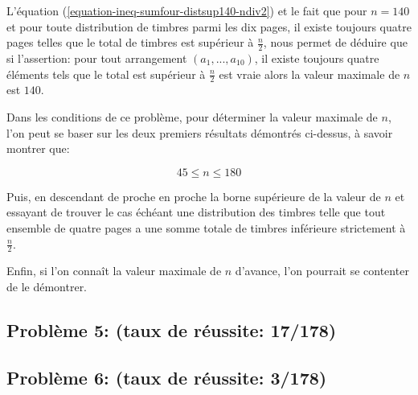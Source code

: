 \documentclass[12pt,a4paper,article]{memoir}
\begin{document}
L'équation (\ref{equation-ineq-sumfour-distsup140-ndiv2}) et le fait que pour $n=140$ et pour toute distribution de timbres parmi les dix pages, il existe toujours quatre pages telles que le total de timbres est supérieur à $\frac{n}{2}$, nous permet de déduire que si l'assertion: pour tout arrangement $(a_{1}, ..., a_{10})$, il existe toujours quatre éléments tels que le total est supérieur à $\frac{n}{2}$ est vraie alors la valeur maximale de $n$ est $140$.

\begin{myremark}[colback=red!5!white,colframe=blue!75!black,mytitle={Comment trouver la valeur maximale de $n$}, label=rmthr]
Dans les conditions de ce problème, pour déterminer la valeur maximale de $n$, l'on peut se baser sur les deux premiers résultats démontrés ci-dessus, à savoir montrer que:

\[45 \leq n \leq 180\]

Puis, en descendant de proche en proche la borne supérieure de la valeur de $n$ et essayant de trouver le cas échéant une distribution des timbres telle que tout ensemble de quatre pages a une somme totale de timbres inférieure strictement à $\frac{n}{2}$.

\bigskip

Enfin, si l'on connaît la valeur maximale de $n$ d'avance, l'on pourrait se contenter de le démontrer.
\end{myremark}

\subsection{Problème 5: (taux de réussite: 17/178)}
\subsection{Problème 6: (taux de réussite: 3/178)}

\printbibliography %
\end{document}
